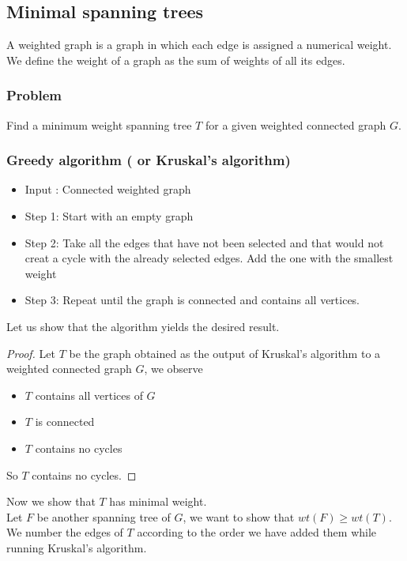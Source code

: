 \documentclass[../main.tex]{subfiles}
\begin{document}
\subsection{Minimal spanning trees}
\begin{defn}
	A weighted graph is a graph in which each edge is assigned a numerical weight.\\
	We define the weight of a graph as the sum of weights of all its edges.
\end{defn}
\subsubsection*{Problem}
Find a minimum weight spanning tree $T$ for a given weighted connected graph $G$.
\subsubsection{Greedy algorithm ( or Kruskal's algorithm) }
\begin{itemize}
\item Input : Connected weighted graph
\item Step 1: Start with an empty graph
\item Step 2: Take all the edges that have not been selected and that would not creat a cycle with the already selected edges. Add the one with the smallest weight
\item Step 3: Repeat until the graph is connected and contains all vertices.
\end{itemize}
Let us show that the algorithm yields the desired result.\\
\begin{proof}
Let $T$ be the graph obtained as the output of Kruskal's algorithm to a weighted connected graph $G$, we observe
\begin{itemize}
\item $T$ contains all vertices of $G$ 
\item $T$ is connected 
\item $T$ contains no cycles
\end{itemize}
So $T$ contains no cycles.
\end{proof}
Now we show that $T$ has minimal weight.\\
Let $F$ be another spanning tree of $G$, we want to show that $wt( F) \geq wt( T) $.\\
We number the edges of $T$ according to the order we have added them while running Kruskal's algorithm.\\
\end{document}
